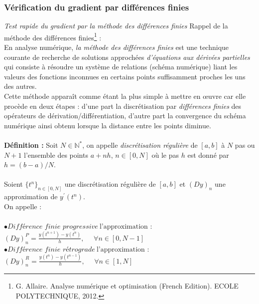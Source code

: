 \documentclass{article}
\begin{document}
\subsubsection{Vérification du gradient par différences finies}
\textit{Test rapide du gradient par la méthode des différences finies}
Rappel de la méthode des différences finies\footnote{

G. Allaire. Analyse numérique et optimisation (French Edition). ECOLE POLYTECHNIQUE, 2012.} :\\
En analyse numérique, \textit{la méthode des différences finies} est une technique courante de recherche de solutions approchées \textit{d'équations aux dérivées partielles} qui consiste à résoudre un système de relations (schéma numérique) liant les valeurs des fonctions inconnues en certains points suffisamment proches les uns des autres.\\

Cette méthode apparaît comme étant la plus simple à mettre en œuvre car elle procède en deux étapes : d'une part la discrétisation par \textit{différences finies} des opérateurs de dérivation/différentiation, d'autre part la convergence du schéma numérique ainsi obtenu lorsque la distance entre les points diminue.\\
$ $\\
\textbf{Définition :}
Soit $N \in \mathbb{N}^{*}$, on appelle \textit{discrétisation régulière} de $[a,b]$ à $N$ pas ou $N+1$ l'ensemble des points $a+nh$, $n \in [0,N]$ o\`{u} le pas $h$ est donné par$h=(b-a)/N$.\\
$ $\\
Soient $\{t^{n}\}_{n\in[0,N]}$ une discrétisation régulière de $[a, b]$ et $(Dy)_{n}$ une approximation de $y^{'}(t^{n})$.\\
On appelle :\\
$ $\\
$\bullet \textit{Différence finie progressive}~\text{l'approximation}$ :\\

  $(Dy)_{n}^{P}=\frac{y(t^{n+1})-y(t^{n})}{h}, ~~~~~~ \forall n \in [0,N-1]$\\


$\bullet \textit{Différence finie rétrograde}~\text{l'approximation}$ :\\

  $(Dy)_{n}^{R}=\frac{y(t^{n})-y(t^{n-1})}{h}, ~~~~~~ \forall n \in [1,N]$\\
\end{document}
